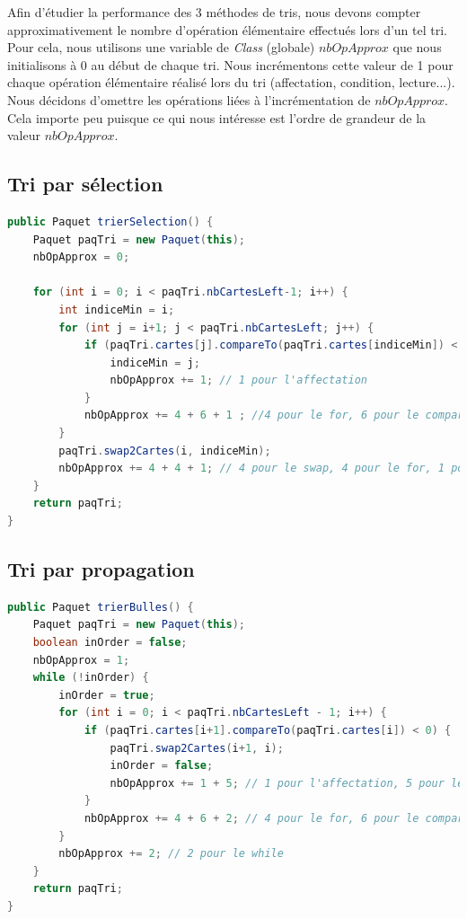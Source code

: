 \documentclass{report}
\begin{document}
\qquad Afin d'étudier la performance des 3 méthodes de tris, nous devons compter approximativement le nombre d'opération élémentaire effectués lors d'un tel tri. Pour cela, nous utilisons une variable de \textit{Class} (globale) $nbOpApprox$ que nous initialisons à 0 au début de chaque tri. Nous incrémentons cette valeur de 1 pour chaque opération élémentaire réalisé lors du tri (affectation, condition, lecture...). Nous décidons d'omettre les opérations liées à l'incrémentation de $nbOpApprox$. Cela importe peu puisque ce qui nous intéresse est l'ordre de grandeur de la valeur $nbOpApprox$.

\subsection{Tri par sélection}

\begin{lstlisting}[language=java, caption={\it Fonction tri sélection}, label=codeSEL]
public Paquet trierSelection() {
    Paquet paqTri = new Paquet(this);
    nbOpApprox = 0;

    for (int i = 0; i < paqTri.nbCartesLeft-1; i++) {
        int indiceMin = i;
        for (int j = i+1; j < paqTri.nbCartesLeft; j++) {
            if (paqTri.cartes[j].compareTo(paqTri.cartes[indiceMin]) < 0) {
                indiceMin = j;
                nbOpApprox += 1; // 1 pour l'affectation
            }
            nbOpApprox += 4 + 6 + 1 ; //4 pour le for, 6 pour le compareTo, 1 pour le if
        }
        paqTri.swap2Cartes(i, indiceMin);
        nbOpApprox += 4 + 4 + 1; // 4 pour le swap, 4 pour le for, 1 pour l'affectation
    }
    return paqTri;
}
\end{lstlisting}

\subsection{Tri par propagation}

\begin{lstlisting}[language=java, caption={\it Fonction tri à bulles}, label=codeBUL]
public Paquet trierBulles() {
    Paquet paqTri = new Paquet(this);
    boolean inOrder = false;
    nbOpApprox = 1;
    while (!inOrder) {
        inOrder = true;
        for (int i = 0; i < paqTri.nbCartesLeft - 1; i++) {
            if (paqTri.cartes[i+1].compareTo(paqTri.cartes[i]) < 0) {
                paqTri.swap2Cartes(i+1, i);
                inOrder = false;
                nbOpApprox += 1 + 5; // 1 pour l'affectation, 5 pour le swap
            }
            nbOpApprox += 4 + 6 + 2; // 4 pour le for, 6 pour le compareTo, 2 pour le if
        }
        nbOpApprox += 2; // 2 pour le while
    }
    return paqTri;
}
\end{lstlisting}
\end{document}
